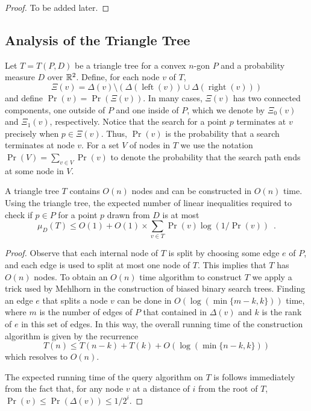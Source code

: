 \documentclass[charterfonts,lotsofwhite]{patmorin}
\DeclareMathOperator{\lft}{left}
\DeclareMathOperator{\rght}{right}
\begin{document}
\begin{proof}
To be added later.
\end{proof}

\subsection{Analysis of the Triangle Tree}

Let $T=T(P,D)$ be a triangle tree for a convex $n$-gon $P$ and a
probability measure 
$D$ over $\mathbb{R}^2$. Define, for each node $v$ of $T$,
\[
   \Xi(v)=\Delta(v)\setminus (\Delta(\lft(v))\cup \Delta(\rght(v)))
\]
and define $\Pr(v)=\Pr(\Xi(v))$.  
In many cases, $\Xi(v)$ has two connected components, one outside of
$P$ and one inside of $P$, which we denote
by $\Xi_0(v)$ and $\Xi_1(v)$, respectively.
Notice that the search for a point
$p$ terminates at $v$ precisely when $p\in\Xi(v)$.  Thus, $\Pr(v)$ is
the probability that a search terminates at node $v$.  For a set $V$
of nodes in $T$ we use the notation $\Pr(V)=\sum_{v\in V}\Pr(v)$ to
denote the probability that the search path ends at some node in $V$.

\begin{lem}
A triangle tree $T$ contains $O(n)$ nodes and can be constructed in
$O(n)$ time.
Using the triangle tree, the expected number of linear inequalities
required to check if $p\in P$ for a point $p$ drawn from $D$ is at
most
\[
 \mu_D(T) 
   \le O(1)+O(1)\times \sum_{v\in T}\Pr(v)\log(1/\Pr(v)) \enspace .
\]
\end{lem}

\begin{proof}

Observe that each internal node of $T$ is split by choosing some edge
$e$ of $P$, and each edge is used to split at most one node of $T$.
This implies that $T$ has $O(n)$ nodes.
To obtain an $O(n)$ time algorithm to construct $T$ we apply a trick
used by Mehlhorn \cite{m75} in the construction of biased binary
search trees.  Finding an edge $e$ that splits a node $v$ can be done
in $O(\log (\min\{m-k,k\}))$ time, where $m$ is the number of edges of $P$ that
contained in $\Delta(v)$ and $k$ is the rank of $e$ in this set of
edges.  In this way, the overall running time of the
construction algorithm is given by the recurrence
\[
    T(n) \le T(n-k) + T(k) + O(\log(\min\{n-k,k\}))
\]
which resolves to $O(n)$.

The expected running time of the query algorithm on $T$ is follows
immediately from the fact that, for any node $v$ at a distance of $i$
from the root of $T$, $\Pr(v) \le \Pr(\Delta(v)) \le 1/2^i$.
\end{proof}
\end{document}
